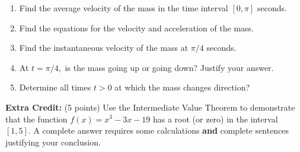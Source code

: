 \documentclass[12pt]{article}
\renewcommand{\emph}[1]{\textsf{\textbf{#1}}}
\begin{document}
\begin{enumerate}
\vspace*{-.5in}

	\begin{enumerate}
	\item Find the average velocity of the mass in the time interval $[0, \pi]$ seconds.
	\vfill
	\item Find the equations for the velocity and acceleration of the mass.\\
	\vfill
	\item Find the instantaneous velocity of the mass at $\pi/4$ seconds.\\
	\vfill
	\item At $t=\pi/4,$ is the mass going up or going down? Justify your answer.\\
	\vfill
	\item Determine all times $t>0$ at which the mass changes direction?
	\vfill
	\end{enumerate}
\end{enumerate}
\newpage
\textbf{Extra Credit:} (5 points) Use the Intermediate Value Theorem to demonstrate that the function $f(x)=x^3-3x-19$ has a root (or zero) in the interval $[1,5].$  A complete answer requires some calculations \emph{and} complete sentences justifying your conclusion.
\vspace{2.5in}
\end{document}
